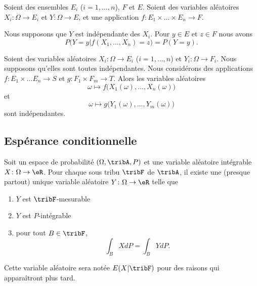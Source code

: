 \begin{lemma}            \label{LEMooZTBSooLemswG}
	Soient des ensembles \( E_i\) (\( i=1,\ldots, n\)), \( F\) et \( E\). Soient des variables aléatoires \( X_i\colon \Omega\to E_i\) et \( Y\colon \Omega\to E\), et une application \( f\colon E_1\times \ldots\times E_n\to F\).

	Nous supposons que \( Y\) est indépendante des \( X_i\). Pour \( y\in E\) et \( z\in F\) nous avons
	\begin{equation}
		P\big( Y=y|f(X_1,\ldots, X_n)=z \big)=P(Y=y).
	\end{equation}
\end{lemma}

\begin{lemma}        \label{LEMooWAOSooBsGucQ}
	Soient des variables aléatoires \( X_i\colon \Omega\to E_i\) (\( i=1,\ldots, n\)) et \( Y_i\colon \Omega\to F_i\). Nous supposons qu'elles sont toutes indépendantes. Nous considérons des applications \( f\colon E_1\times \ldots E_n\to S\) et \( g\colon F_1\times F_m\to T\). Alors les variables aléatoires
	\begin{equation}
		\omega\mapsto f\big( X_1(\omega),\ldots, X_n(\omega) \big)
	\end{equation}
	et
	\begin{equation}
		\omega\mapsto g\big( Y_1(\omega),\ldots, Y_m(\omega) \big)
	\end{equation}
	sont indépendantes.
\end{lemma}

\subsection{Espérance conditionnelle}

\begin{theoremDef}     \label{ThoMWfDPQ}
	Soit un espace de probabilité \( (\Omega,\tribA,P)\) et une variable aléatoire intégrable \( X\colon \Omega\to \eR\). Pour chaque sous tribu \( \tribF\) de \( \tribA\), il existe une (presque partout) unique variable aléatoire \( Y\colon \Omega\to \eR\) telle que
	\begin{enumerate}
		\item
		      \( Y\) est \( \tribF\)-mesurable
		\item
		      \( Y\) est \( P\)-intégrable
		\item
		      pour tout \( B\in\tribF\),
		      \begin{equation}        \label{EqBwBkgE}
			      \int_{B}XdP=\int_B YdP.
		      \end{equation}
	\end{enumerate}
	Cette variable aléatoire sera notée \( E(X|\tribF)\) pour des raisons qui apparaîtront plus tard.
\end{theoremDef}

